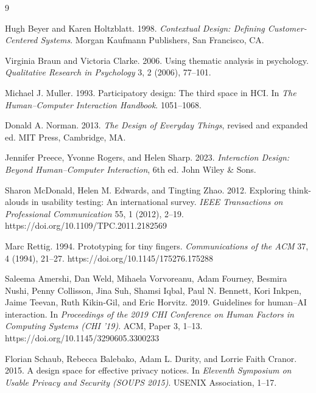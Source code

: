 \documentclass[sigconf,nonacm]{acmart}
\begin{document}
\begin{thebibliography}{9}

Hugh Beyer and Karen Holtzblatt. 1998.
\newblock \emph{Contextual Design: Defining Customer-Centered Systems}.
\newblock Morgan Kaufmann Publishers, San Francisco, CA.

Virginia Braun and Victoria Clarke. 2006.
\newblock Using thematic analysis in psychology.
\newblock \emph{Qualitative Research in Psychology} 3, 2 (2006), 77--101.

Michael J. Muller. 1993.
\newblock Participatory design: The third space in HCI.
\newblock In \emph{The Human--Computer Interaction Handbook}. 1051--1068.

Donald A. Norman. 2013.
\newblock \emph{The Design of Everyday Things}, revised and expanded ed.
\newblock MIT Press, Cambridge, MA.

Jennifer Preece, Yvonne Rogers, and Helen Sharp. 2023.
\newblock \emph{Interaction Design: Beyond Human--Computer Interaction}, 6th ed.
\newblock John Wiley \& Sons.

Sharon McDonald, Helen M. Edwards, and Tingting Zhao. 2012.
\newblock Exploring think-alouds in usability testing: An international survey.
\newblock \emph{IEEE Transactions on Professional Communication} 55, 1 (2012),
2--19.
\newblock https://doi.org/10.1109/TPC.2011.2182569

Marc Rettig. 1994.
\newblock Prototyping for tiny fingers.
\newblock \emph{Communications of the ACM} 37, 4 (1994), 21--27.
\newblock https://doi.org/10.1145/175276.175288

Saleema Amershi, Dan Weld, Mihaela Vorvoreanu, Adam Fourney, Besmira Nushi,
Penny Collisson, Jina Suh, Shamsi Iqbal, Paul N. Bennett, Kori Inkpen,
Jaime Teevan, Ruth Kikin-Gil, and Eric Horvitz. 2019.
\newblock Guidelines for human--AI interaction.
\newblock In \emph{Proceedings of the 2019 CHI Conference on Human Factors in
Computing Systems (CHI '19)}. ACM, Paper 3, 1--13.
\newblock https://doi.org/10.1145/3290605.3300233

Florian Schaub, Rebecca Balebako, Adam L. Durity, and Lorrie Faith Cranor.
2015.
\newblock A design space for effective privacy notices.
\newblock In \emph{Eleventh Symposium on Usable Privacy and Security
(SOUPS 2015)}. USENIX Association, 1--17.


\end{thebibliography}
\end{document}
